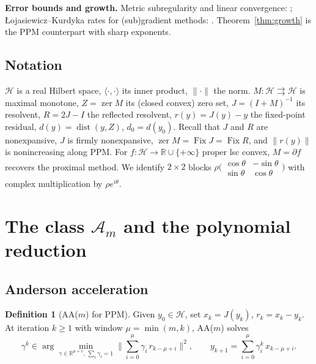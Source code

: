 \documentclass[11pt]{article}
\theoremstyle{definition}
\newtheorem{definition}[theorem]{Definition}
\theoremstyle{remark}
\DeclareMathOperator{\zer}{zer}
\DeclareMathOperator{\dist}{dist}
\newcommand{\Hh}{\mathcal{H}}
\newcommand{\Aa}{\mathcal{A}}
\newcommand{\R}{\mathbb{R}}
\newcommand{\inner}[2]{\langle #1, #2 \rangle}
\newcommand{\norm}[1]{\| #1 \|}
\begin{document}
\textbf{Error bounds and growth.} Metric subregularity and linear
convergence: \cite{leventhal2009metric}; \L ojasiewicz--Kurdyka rates for
(sub)gradient methods: \cite{kurdyka1998gradients,attouch2009proximal,
bolte2007lojasiewicz,li2018calculus}. Theorem~\ref{thm:growth} is the PPM
counterpart with sharp exponents.

\subsection{Notation}

$\Hh$ is a real Hilbert space, $\inner{\cdot}{\cdot}$ its inner product,
$\norm{\cdot}$ the norm. $M:\Hh\rightrightarrows\Hh$ is maximal monotone,
$Z=\zer M$ its (closed convex) zero set, $J=(I+M)^{-1}$ its resolvent,
$R=2J-I$ the reflected resolvent, $r(y)=J(y)-y$ the fixed-point residual,
$d(y)=\dist(y,Z)$, $d_0=d(y_0)$. Recall that $J$ and $R$ are nonexpansive,
$J$ is firmly nonexpansive, $\zer M=\operatorname{Fix}J=\operatorname{Fix}R$,
and $\norm{r(y)}$ is nonincreasing along PPM. For $f:\Hh\to\R\cup\{+\infty\}$
proper lsc convex, $M=\partial f$ recovers the proximal method. We identify
$2\times2$ blocks $\rho\big(\begin{smallmatrix}\cos\theta&-\sin\theta\\
\sin\theta&\cos\theta\end{smallmatrix}\big)$ with complex multiplication by
$\rho e^{i\theta}$.

\section{The class $\Aa_m$ and the polynomial reduction}\label{sec:poly}

\subsection{Anderson acceleration}

\begin{definition}[AA($m$) for PPM]\label{def:aam}
Given $y_0\in\Hh$, set $x_k=J(y_k)$, $r_k=x_k-y_k$. At iteration $k\ge 1$
with window $\mu=\min(m,k)$, AA($m$) solves
\begin{equation}\label{eq:aa}
\gamma^k\in\arg\min_{\gamma\in\R^{\mu+1},\,\sum_i\gamma_i=1}
\Big\|\sum_{i=0}^{\mu}\gamma_i\, r_{k-\mu+i}\Big\|^2,
\qquad
y_{k+1}=\sum_{i=0}^{\mu}\gamma^k_i\, x_{k-\mu+i}.
\end{equation}
\end{definition}
\end{document}
